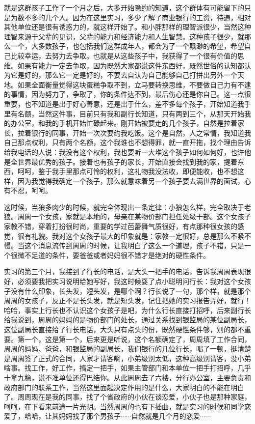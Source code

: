 就是这群孩子工作了一个月之后，大多开始隐约的知道，这个群体有可能留下的只是为数不多的几个人。因为在这里实习，多少了解了商业银行的工资，待遇，相对其他单位还是很有诱惑力的，就这样开始了。和小胖那样的理智派很少，当然这种理智来源于父辈的见识，父辈的能力和经济能力和人生智慧。这种孩子很少，就那么一个，大多数孩子，也包括我们这群成年人，都会为了一个飘渺的希望，希望自己比较幸运，去努力去争取。也就是从这些孩子中，我获得了一个很有价值的思维。如果有能力一定去争取，因为既然大家都说这件东西好，既然世俗的认知都认为它是好的，那么它一定是好的，不要去自认为自己能够自己打拼出另外一个天地。如果全面衡量觉得这块蛋糕争取不到，立马要转换思维，不要做自己力有不逮的事情，因为努力了，争取了，你的条件达不到，最后伤心还是你自己。这一点很重要，也不知道是出于好心善意，还是出于什么，差不多每个孩子，开始知道我手里有名额，当然这件事，目前只有我和副行长知道，只有两到三个，从那天开始我的办公室，和我的手机开始忙碌起来。刚开始被要走的几个孩子，自然是拉着家长，拉着银行的同事，开始一次次要约我吃饭。这个是自然，人之常情，我知道我自己那点权利，只有两个名额，这个我谁也不想得罪，就一直开拖，找个理由告诉给我电话的人说：我没有这个权利，我也要听一大堆这个孩子如何如何好，也许他是全世界最优秀的孩子。接着也有孩子的家长，开始直接会找到我的家，提着东西，呵呵，鉴于我手里那点可怜的权利，这礼物我没法收，即便能收，也不想这样，因为我觉得我确定一个孩子，那么就意味着另一个孩子要去满世界的面试，心有不忍，呵呵。

这时候，当狼多肉少的时候，就完全体现出一条定律：小狼怎么样，完全取决于老狼。周周一个女孩，家就是本地的，母亲在某物价部门担任处级干部。这个女孩子家教不错，穿着打扮很时尚，重要的学过芭蕾舞气质很好，有点那种很女孩的感觉，很有礼貌。我对这个女孩子最大的印象就是：家教一定很好，总是那么不紧不慢。当这个消息流传到周周的时候，让我明白了这么一个道理，孩子不错，只是一个很微不足道的条件，要爸爸或者妈妈很不错才是绝对的硬性条件。


实习的第三个月，我接到了行长的电话，是大头一把手的电话，告诉我周周表现很好，必须要我把实习说明给她写好，我这时候耍了点小聪明问行长：我对这个女孩子没有什么印象，长头发，短头发，是哪个啊？行长说了一句，那个样，就是那个周周的女孩子，反正不是长头发，就是短头发，记住把她的实习报告弄好，就行！哈哈，事实上行长也不认识这个女孩子是吧，为什么行长直接打招呼，后来副行长给我说到，周周的妈妈的是物价部门的处长，通过关系找到银监局的某位副局长，这位副局长直接给了行长电话，大头只有点头的份，既然硬性条件够，别的都不重要。第一个，这是第一个，后来更是听说，这个名额确定了，周周填了工作合同，周周的妈妈、爸爸，和银监局的副局长，我们银行的几位行长，喝了一顿，挺清楚是周周签了正式的合同，人家才请客啊，小弟级别太低，这种高级别请客，没小弟啥事。找工作，好工作，搞定一把手，如果主管部门和本单位一把手打招呼，几乎十拿九稳，说不准单位还得巴结你。从此周周去了六楼，分行办公室，主要负责和政府部门的联系工作，当然这里面起决定作用的是什么，大家明白的不能在明白了。周周现在是我的同事，找了个省政府的小伙在谈恋爱，小伙子也是那种家庭，呵呵，在下看来前途一片光明。当然周周的也有下插曲，就是实习的时候和同学恋爱了，哈哈，让其妈妈找了那个男孩子$\cdots\cdots$自然就是几个月的恋爱$\cdots\cdots$

